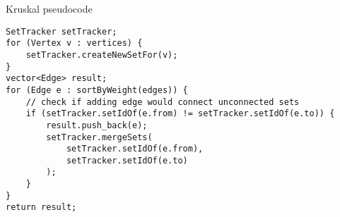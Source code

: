 \begin{frame}[fragile,label=kruskalCode]{Kruskal pseudocode}
\lstset{language=C++,style=small}
\begin{lstlisting}
SetTracker setTracker;
for (Vertex v : vertices) {
    setTracker.createNewSetFor(v);
}
vector<Edge> result;
for (Edge e : sortByWeight(edges)) {
    // check if adding edge would connect unconnected sets
    if (setTracker.setIdOf(e.from) != setTracker.setIdOf(e.to)) {
        result.push_back(e);
        setTracker.mergeSets(
            setTracker.setIdOf(e.from),
            setTracker.setIdOf(e.to)
        );
    }
}
return result;
\end{lstlisting}
\end{frame}
